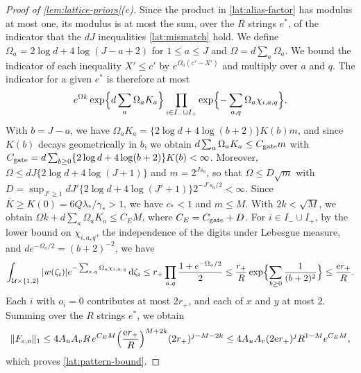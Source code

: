 \begin{proof}[Proof of \cref{lem:lattice-priors}(c)]
Since the product in \eqref{lat:alias-factor} has modulus at most one,
its modulus is at most the sum, over the $R$ strings $e^*$, of the
indicator
that the $dJ$ inequalities \eqref{lat:mismatch} hold. We define
$\Omega_a=2\log d+4\log(J-a+2)$ for $1\le a\le J$ and
$\Omega=d\sum_a\Omega_a$. We bound the indicator of each inequality
$X'\le c'$ by $e^{\Omega_a(c'-X')}$ and multiply over $a$ and $q$. The
indicator for a given $e^*$ is therefore at most
\[
 e^{\Omega k}\exp\Bigl\{d\sum_a\Omega_aK_a\Bigr\}
 \prod_{i\in I_-\cup I_+}\exp\Bigl\{-\sum_{a,q}\Omega_a\chi_{i,a,q}\Bigr\}.
\]
With $b=J-a$, we have $\Omega_aK_a=\{2\log d+4\log(b+2)\}K(b)m$, and
since $K(b)$ decays geometrically in $b$, we obtain
$d\sum_a\Omega_aK_a\le C_{\rm gate}m$ with
$C_{\rm gate}=d\sum_{b\ge0}\{2\log d+4\log(b+2)\}K(b)<\infty$. Moreover,
$\Omega\le dJ\{2\log d+4\log(J+1)\}$ and $m=2^{Js_0}$, so that
$\Omega\le D\sqrt m$ with
$D=\sup_{J'\ge1}dJ'\{2\log d+4\log(J'+1)\}2^{-J's_0/2}<\infty$. Since
$\overline K\ge K(0)=6Q\lambda_*/\gamma_*>1$, we have $c_*<1$ and
$m\le M$. With $2k<\sqrt M$, we obtain
$\Omega k+d\sum_a\Omega_aK_a\le C_EM$, where $C_E=C_{\rm gate}+D$. For
$i\in I_-\cup I_+$, by the lower bound on $\chi_{i,a,q}$, the
independence of the digits under Lebesgue measure, and
$de^{-\Omega_a/2}=(b+2)^{-2}$, we have
\[
 \int_{\mathcal U\times\{1,2\}}|w(\zeta_i)|
     e^{-\sum_{a,q}\Omega_a\chi_{i,a,q}}\,\mathrm d\zeta_i
 \le r_+\prod_{a,q}\frac{1+e^{-\Omega_a/2}}2
 \le\frac{r_+}R\exp\Bigl\{\sum_{b\ge0}\frac1{(b+2)^2}\Bigr\}
 \le\frac{\mathrm er_+}R .
\]
Each $i$ with $o_i=0$ contributes at most $2r_+$, and each of $x$ and
$y$ at most $2$. Summing over the $R$ strings $e^*$, we obtain
\[
 \|F_{\varepsilon,o}\|_1\le4A_uA_vR\,e^{C_EM}
 \Bigl(\frac{\mathrm er_+}R\Bigr)^{M+2k}(2r_+)^{j-M-2k}
 \le4A_uA_v(2\mathrm er_+)^jR^{1-M}e^{C_EM},
\]
which proves \eqref{lat:pattern-bound}.
\end{proof}

